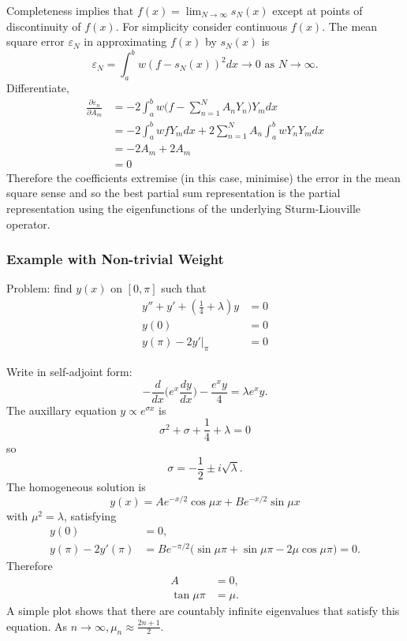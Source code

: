\documentclass[a4paper]{article}
\begin{document}
\begin{enumerate}
\[  \]
  Completeness implies that \(f(x) = \lim_{N\to \infty}s_N(x)\) except at points of discontinuity of \(f(x)\). For simplicity consider continuous \(f(x)\). The mean square error \(\varepsilon_N\) in approximating \(f(x)\) by \(s_N(x)\) is
  \[
\varepsilon_N = \int_{a}^{b} w(f-s_N(x))^2 dx \to 0 \text{ as } N\to \infty.
\]
Differentiate,
\begin{align*}
  \frac{\partial\varepsilon_n}{\partial A_m} &= -2 \int_{a}^{b} w \Big(f- \sum_{n=1}^{N}A_nY_n \Big) Y_m dx \\
                                             &= -2 \int_{a}^{b} wfY_m dx + 2 \sum_{n=1}^{N}A_n \int_{a}^{b} wY_nY_m dx \\
                                             &= -2A_m + 2A_m \\
                                             &= 0
\end{align*}
Therefore the coefficients extremise (in this case, minimise) the error in the mean square sense and so the best partial sum representation is the partial representation using the eigenfunctions of the underlying Sturm-Liouville operator.
  
\subsubsection{Example with Non-trivial Weight}

Problem: find \(y(x)\) on \([0,\pi]\) such that
\begin{align*}
  y'' + y' + (\frac{1}{4} + \lambda)y &=0 \\
  y(0) &= 0 \\
  y(\pi) - 2y'|_\pi &=0
\end{align*}

Write in self-adjoint form:
\[
  - \frac{d}{dx}\Big( e^x \frac{dy}{dx} \Big)- \frac{e^xy}{4} = \lambda e^xy.
\]
The auxillary equation \(y \propto e^{\sigma x}\) is
\[
  \sigma^2 + \sigma + \frac{1}{4} + \lambda = 0
\]
so
\[
  \sigma = -\frac{1}{2} \pm i \sqrt{\lambda}.
\]
The homogeneous solution is
\[
  y(x) = A e^{-x/2}\cos\mu x + B e^{-x/2}\sin\mu x
\]
with \(\mu^2=\lambda\), satisfying
\begin{align*}
  y(0) &= 0, \\
  y(\pi) - 2y'(\pi) &= Be^{-\pi/2}\big( \sin\mu\pi + \sin\mu\pi - 2\mu\cos\mu\pi \big)=0.
\end{align*}
Therefore
\begin{align*}
  A &= 0, \\
  \tan\mu\pi &= \mu.
\end{align*}
A simple plot shows that there are countably infinite eigenvalues that satisfy this equation. As \(n\to \infty,\mu_n \approx \frac{2n+1}{2}\).


\end{enumerate}
\end{document}

